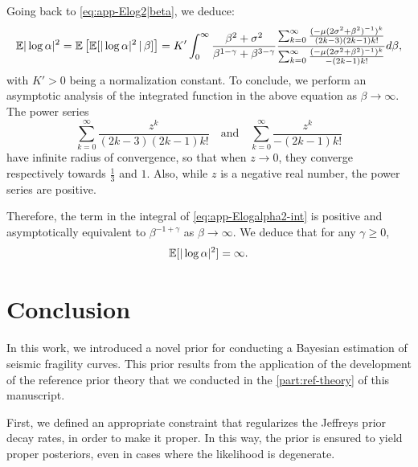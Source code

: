 Going back to \cref{eq:app-Elog2|beta}, we deduce:
    \begin{equation}\label{eq:app-Elogalpha2-int}
        \mathbb{E}|\log\alpha|^2 = \mathbb{E}\left[\mathbb{E}[|\log\alpha|^2\,|\,\beta]\right] = K'\int_0^\infty \frac{\beta^2+\sigma^2}{\beta^{1-\gamma}+\beta^{3-\gamma}}
        \frac{\sum_{k=0}^\infty \frac{(-\mu(2\sigma^2+\beta^2)^{-1})^k}{(2k-3)(2k-1)k!} }{\sum_{k=0}^\infty \frac{(-\mu(2\sigma^2+\beta^2)^{-1})^k}{-(2k-1)k!}}d\beta,
    \end{equation}
with $K'>0$ being a normalization constant.
To conclude, we perform an asymptotic analysis of the integrated function in the above equation as $\beta\to\infty$.
The power series 
    \begin{equation}
        \sum_{k=0}^\infty \frac{z^k}{(2k-3)(2k-1)k!} \quad\text{and}\quad 
        \sum_{k=0}^\infty \frac{z^k}{-(2k-1)k!}
    \end{equation}
have infinite radius of convergence, so that when $z\to0$, they converge respectively towards $\frac{1}{3}$ and $1$.
Also, while $z$ is a negative real number, the power series are positive.

Therefore, the term in the integral of \cref{eq:app-Elogalpha2-int} is positive and asymptotically equivalent to $\beta^{-1+\gamma}$ as $\beta\to\infty$. We deduce that for any $\gamma\geq0$,
    \begin{equation}
        \mathbb{E}[|\log\alpha|^2]=\infty.
    \end{equation}
    





\section{Conclusion}\label{sec:constr-frags:conclusion}




In this work, we introduced a novel prior for conducting a Bayesian estimation of seismic fragility curves.
This prior results from the application of the development of the reference prior theory that we conducted in the \cref{part:ref-theory} of this manuscript.

First, we defined an appropriate constraint that regularizes the Jeffreys prior decay rates, in order to make it proper. In this way, the prior is ensured to yield proper posteriors, even in cases where the likelihood is degenerate.

